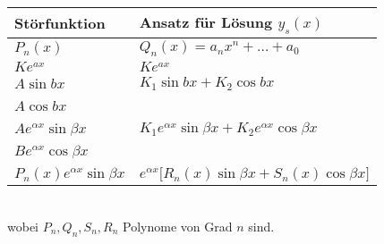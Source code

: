 \renewcommand{\arraystretch}{1.6}
\begin{tabularx}{\textwidth}{|Y|Y|}
\hline
Störfunktion & Ansatz für Lösung $y_s(x)$  \\\hline\hline
$P_n(x)$        & $Q_n(x)=a_nx^n+\dots+a_0$  \\ [1.5ex]\hline
$Ke^{ax}$        & $Ke^{ax}$  \\ [1.5ex]\hline
$A\sin bx$        & $K_1\sin bx +K_2\cos bx $  \\ [1.5ex]
$A\cos bx$        & ~  \\ [1.5ex]\hline
$Ae^{\alpha x}\sin \beta x$        & $K_1e^{\alpha x}\sin\beta x+K_2 e^{\alpha x}\cos\beta x$  \\ [1.5ex]
$Be^{\alpha x}\cos \beta x$        & ~  \\ [1.5ex]\hline
$P_n(x)e^{\alpha x}\sin\beta x$        & $e^{\alpha x}\lbrack R_n(x)\sin\beta x+S_n(x)\cos\beta x\rbrack$  \\ [1.5ex]\hline
 \end{tabularx}\\

wobei $P_n,Q_n,S_n,R_n$ Polynome von Grad $n$ sind.
